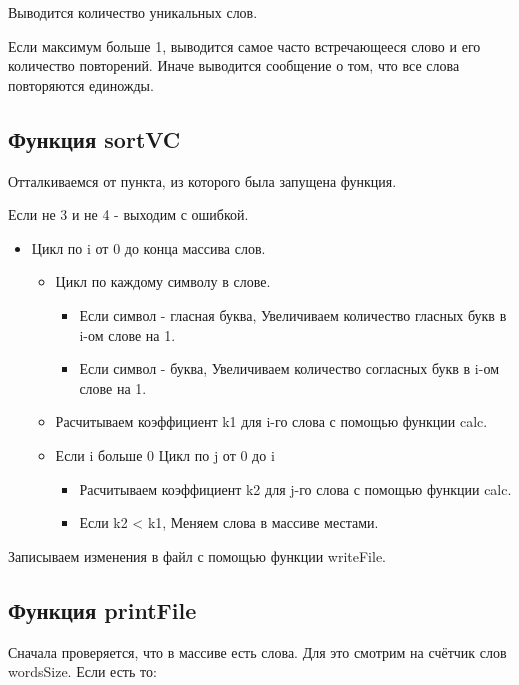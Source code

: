 \documentclass[12pt,a4paper]{article}  %
\begin{document}
Выводится количество уникальных слов.

Если максимум больше 1, выводится самое часто встречающееся слово и его количество повторений. Иначе выводится сообщение о том, что все слова повторяются единожды.

\subsection*{Функция sortVC}

Отталкиваемся от пункта, из которого была запущена функция.

Если не 3 и не 4 - выходим с ошибкой.

\begin{itemize}
\item Цикл по i от 0 до конца массива слов.
	\begin{itemize}
		\item Цикл по каждому символу в слове.
		\begin{itemize}
			\item Если символ - гласная буква, Увеличиваем количество гласных букв в i-ом слове на 1.
			\item Если символ - буква, Увеличиваем количество согласных букв в i-ом слове на 1.
		\end{itemize}
	\item Расчитываем коэффициент k1 для i-го слова с помощью функции calc.
	\item Если i больше 0
	\subitem Цикл по j от 0 до i
		\begin{itemize}
		\item Расчитываем коэффициент k2 для j-го слова с помощью функции calc.
		\item Если k2 < k1, Меняем слова в массиве местами.
		\end{itemize}
	\end{itemize}
\end{itemize}

Записываем изменения в файл с помощью функции writeFile.

\subsection*{Функция printFile}

Сначала проверяется, что в массиве есть слова. Для это смотрим на счётчик слов wordsSize. Если есть то:
\end{document}

